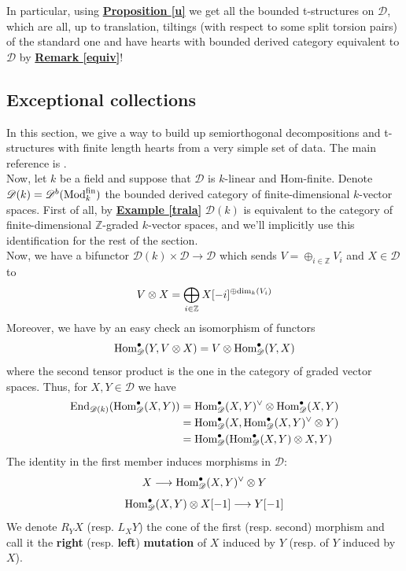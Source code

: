 In particular, using \hyperref[u]{\textbf{Proposition \ref*{u}}} we get all the bounded t-structures on $\mathscr{D}$, which are all, up to translation, tiltings (with respect to some split torsion pairs) of the standard one and have hearts with bounded derived category equivalent to $\mathscr{D}$ by \hyperref[equiv]{\textbf{Remark \ref*{equiv}}}!  

\newpage
\subsection{Exceptional collections}
In this section, we give a way to build up semiorthogonal decompositions and t-structures with finite length hearts from a very simple set of data. The main reference is \cite{hel}. \\ 
Now, let $k$ be a field and suppose that $\mathscr{D}$ is $k$-linear and Hom-finite. Denote $\mathscr{D}(k)=\mathscr{D}^b(\textnormal{Mod}_k^{\textnormal{fin}})$ the bounded derived category of finite-dimensional $k$-vector spaces. First of all, by \hyperref[trala]{\textbf{Example \ref*{trala}}} $\mathscr{D}(k)$ is equivalent to the category of finite-dimensional $\mathbb{Z}$-graded $k$-vector spaces, and we'll implicitly use this identification for the rest of the section. \\
Now, we have a bifunctor $\mathscr{D}(k) \times \mathscr{D} \longrightarrow \mathscr{D}$ which sends $V=\oplus_{i \in \mathbb{Z}}V_i$ and $X \in \mathscr{D}$ to $$V \otimes X=\bigoplus_{i \in \mathbb{Z}} X[-i]^{\oplus \textnormal{dim}_k(V_i)}$$ 
Moreover, we have by an easy check an isomorphism of functors $$\textnormal{Hom}_{\mathscr{D}}^{\bullet}(Y,V \otimes X)=V \otimes \textnormal{Hom}_{\mathscr{D}}^{\bullet}(Y,X)$$
where the second tensor product is the one in the category of graded vector spaces. Thus, for $X,Y \in \mathscr{D}$ we have 
\begin{align*}
\textnormal{End}_{\mathscr{D}(k)}(\textnormal{Hom}_{\mathscr{D}}^{\bullet}(X,Y)) & = \textnormal{Hom}_{\mathscr{D}}^{\bullet}(X,Y)^{\vee} \otimes \textnormal{Hom}_{\mathscr{D}}^{\bullet}(X,Y)  \\
&=\textnormal{Hom}_{\mathscr{D}}^{\bullet}(X,\textnormal{Hom}_{\mathscr{D}}^{\bullet}(X,Y)^{\vee} \otimes Y) \\
&=\textnormal{Hom}_{\mathscr{D}}^{\bullet}(\textnormal{Hom}_{\mathscr{D}}^{\bullet}(X,Y)\otimes X,Y)
\end{align*}
The identity in the first member induces morphisms in $\mathscr{D}$: 
$$X \longrightarrow \textnormal{Hom}_{\mathscr{D}}^{\bullet}(X,Y)^{\vee} \otimes Y$$
$$\textnormal{Hom}_{\mathscr{D}}^{\bullet}(X,Y) \otimes X[-1] \longrightarrow Y[-1]$$
We denote $R_YX$ (resp. $L_XY$) the cone of the first (resp. second) morphism and call it the \textbf{right} (resp. \textbf{left}) \textbf{mutation} of $X$ induced by $Y$ (resp. of $Y$ induced by $X$). \\

